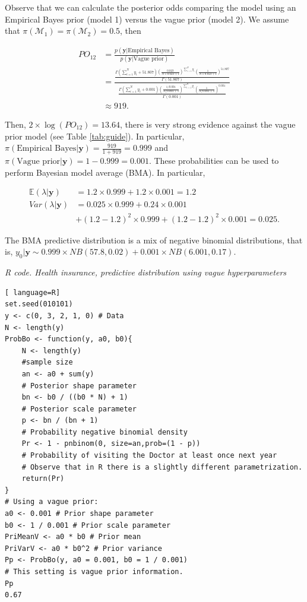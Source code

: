 Observe that we can calculate the posterior odds comparing the model using an Empirical Bayes prior (model 1) versus the vague prior (model 2). We assume that $\pi(\mathcal{M}_1)=\pi(\mathcal{M}_2)=0.5$, then

\begin{align*}
	PO_{12}&=\frac{p(\mathbf{y}|\text{Empirical Bayes})}{p(\mathbf{y}|\text{Vague prior})}\\
	&=\frac{\frac{\Gamma(\sum_{i=1}^N y_i+51.807)\left(\frac{0.023}{N\times 0.023+1}\right)^{\sum_{i=1}^N y_i}\left(\frac{1}{N\times 0.023+1}\right)^{51.807}}{\Gamma(51.807)}}{\frac{\Gamma(\sum_{i=1}^N y_i+0.001)\left(\frac{1/0.001}{N/0.001+1}\right)^{\sum_{i=1}^N y_i}\left(\frac{1}{N/0.001+1}\right)^{0.001}}{\Gamma(0.001)}}\\
	&\approx 919.
\end{align*}

Then, $2\times \log(PO_{12})=13.64$, there is very strong evidence against the vague prior model (see Table \ref{tab:guide}). In particular, $\pi(\text{Empirical Bayes}|\mathbf{y})=\frac{919}{1+919}=0.999$ and $\pi(\text{Vague prior}|\mathbf{y})=1-0.999=0.001$. These probabilities can be used to perform Bayesian model average (BMA). In particular,

\begin{align*}
	\mathbb{E}(\lambda|\mathbf{y})&=1.2\times 0.999+1.2\times 0.001=1.2\\
	Var(\lambda|\mathbf{y})&=0.025\times 0.999+0.24\times 0.001\\
	& + (1.2-1.2)^2\times 0.999 + (1.2-1.2)^2\times 0.001= 0.025.
\end{align*}

The BMA predictive distribution is a mix of negative binomial distributions, that is, $y_0|\mathbf{y}\sim 0.999\times NB(57.8, 0.02)+0.001\times NB(6.001, 0.17)$.

\begin{tcolorbox}[enhanced,width=4.67in,center upper,
	fontupper=\large\bfseries,drop shadow southwest,sharp corners]
\textit{R code. Health insurance, predictive distribution using vague hyperparameters}
\begin{VF}
\begin{lstlisting}[ language=R]
set.seed(010101)
y <- c(0, 3, 2, 1, 0) # Data
N <- length(y)
ProbBo <- function(y, a0, b0){
	N <- length(y)
	#sample size
	an <- a0 + sum(y) 
	# Posterior shape parameter
	bn <- b0 / ((b0 * N) + 1) 
	# Posterior scale parameter
	p <- bn / (bn + 1) 
	# Probability negative binomial density
	Pr <- 1 - pnbinom(0, size=an,prob=(1 - p)) 
	# Probability of visiting the Doctor at least once next year
	# Observe that in R there is a slightly different parametrization.
	return(Pr)
} 
# Using a vague prior:
a0 <- 0.001 # Prior shape parameter
b0 <- 1 / 0.001 # Prior scale parameter
PriMeanV <- a0 * b0 # Prior mean
PriVarV <- a0 * b0^2 # Prior variance
Pp <- ProbBo(y, a0 = 0.001, b0 = 1 / 0.001) 
# This setting is vague prior information.
Pp
0.67
\end{lstlisting}
\end{VF}
\end{tcolorbox} 


